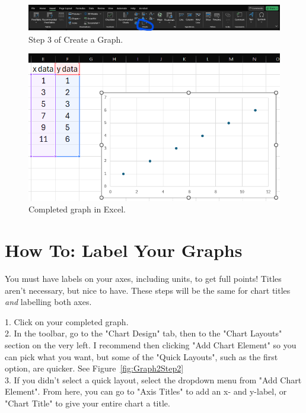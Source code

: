 \documentclass[11pt]{article}
\begin{document}
\begin{figure}
    \centering
    \includegraphics[width=\linewidth]{Images/1step3.png}
    \caption{Step 3 of Create a Graph.}
    \label{fig:GraphStep3}
\end{figure}

\begin{figure}
    \centering
    \includegraphics[width=0.75\linewidth]{Images/1step4.png}
    \caption{Completed graph in Excel.}
    \label{fig:GraphStep4}
\end{figure}


\section{How To: Label Your Graphs}

You must have labels on your axes, including units, to get full points! Titles aren't necessary, but nice to have. These steps will be the same for chart titles \emph{and} labelling both axes.

1. Click on your completed graph. \\

2. In the toolbar, go to the "Chart Design" tab, then to the "Chart Layouts" section on the very left. I recommend then clicking "Add Chart Element" so you can pick what you want, but some of the "Quick Layouts", such as the first option, are quicker. See Figure~\ref{fig:Graph2Step2}\\

3. If you didn't select a quick layout,  select the dropdown menu from "Add Chart Element". From here, you can go to "Axis Titles" to add an x- and y-label, or "Chart Title" to give your entire chart a title. \\
\end{document}
